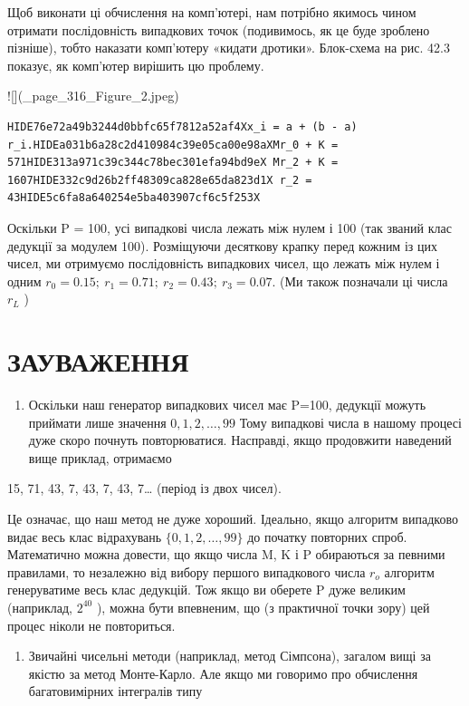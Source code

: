 \documentclass[
  ukrainian,
]{article}
\providecommand{\tightlist}{%
  \setlength{\itemsep}{0pt}\setlength{\parskip}{0pt}}
\begin{document}
Щоб виконати ці обчислення на комп'ютері, нам потрібно якимось чином отримати послідовність випадкових точок (подивимось, як це буде зроблено пізніше), тобто наказати комп'ютеру «кидати дротики». Блок-схема на рис. 42.3 показує, як комп'ютер вирішить цю проблему.

![](\_page\_316\_Figure\_2.jpeg)

\begin{verbatim}
HIDE76e72a49b3244d0bbfc65f7812a52af4Xx_i = a + (b - a) r_i.HIDEa031b6a28c2d410984c39e05ca00e98aXMr_0 + K = 571HIDE313a971c39c344c78bec301efa94bd9eX Mr_2 + K = 1607HIDE332c9d26b2ff48309ca828e65da823d1X r_2 = 43HIDE5c6fa8a640254e5ba403907cf6c5f253X
\end{verbatim}

Оскільки P = 100, усі випадкові числа лежать між нулем і 100 (так званий
клас дедукції за модулем 100). Розміщуючи десяткову крапку перед кожним
із цих чисел, ми отримуємо послідовність випадкових чисел, що лежать між
нулем і одним \(r_0=0.15;\ r_1=0.71;\ r_2=0.43;\ r_3=0.07.\) (Ми також
позначали ці числа \(r_L\) )

\section{ЗАУВАЖЕННЯ}\label{ux437ux430ux443ux432ux430ux436ux435ux43dux43dux44f-10}

\begin{enumerate}
\def\labelenumi{\arabic{enumi}.}
\tightlist
\item
  Оскільки наш генератор випадкових чисел має P=100, дедукції можуть
  приймати лише значення \(0,1,2,\ldots,99\) Тому випадкові числа в
  нашому процесі дуже скоро почнуть повторюватися. Насправді, якщо
  продовжити наведений вище приклад, отримаємо
\end{enumerate}

15, 71, 43, 7, 43, 7, 43, 7\ldots{} (період із двох чисел).

Це означає, що наш метод не дуже хороший. Ідеально, якщо алгоритм
випадково видає весь клас відрахувань \(\{0, 1, 2, \ldots, 99\}\) до
початку повторних спроб. Математично можна довести, що якщо числа M, K і
P обираються за певними правилами, то незалежно від вибору першого
випадкового числа \(r_o\) алгоритм генеруватиме весь клас дедукцій. Тож
якщо ви оберете P дуже великим (наприклад, \(2^{40}\) ), можна бути
впевненим, що (з практичної точки зору) цей процес ніколи не
повториться.

\begin{enumerate}
\def\labelenumi{\arabic{enumi}.}
\setcounter{enumi}{1}
\tightlist
\item
  Звичайні чисельні методи (наприклад, метод Сімпсона), загалом вищі за
  якістю за метод Монте-Карло. Але якщо ми говоримо про обчислення
  багатовимірних інтегралів типу
\end{enumerate}
\end{document}
